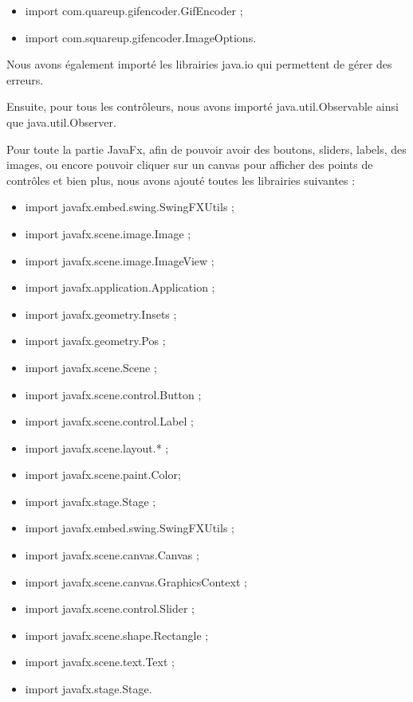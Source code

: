 \documentclass[11pt, titlepage]{article}
\begin{document}
\begin{itemize}
	\item import com.quareup.gifencoder.GifEncoder ;
	\item import com.squareup.gifencoder.ImageOptions.
\end{itemize}


Nous avons également importé les librairies java.io qui permettent de gérer des erreurs.

Ensuite, pour tous les contrôleurs, nous avons importé java.util.Observable ainsi que java.util.Observer.

Pour toute la partie JavaFx, afin de pouvoir avoir des boutons, sliders, labels, des images, ou encore pouvoir cliquer sur un canvas pour afficher des points de contrôles et bien plus, nous avons ajouté toutes les librairies suivantes :


\begin{itemize}
	\item import javafx.embed.swing.SwingFXUtils ;
	\item import javafx.scene.image.Image ;
	\item import javafx.scene.image.ImageView ;
	\item import javafx.application.Application ;
	\item import javafx.geometry.Insets ;
	\item import javafx.geometry.Pos ;
	\item import javafx.scene.Scene ;
	\item import javafx.scene.control.Button ;
	\item import javafx.scene.control.Label ;
	\item import javafx.scene.layout.* ;
	\item import javafx.scene.paint.Color;
	\item import javafx.stage.Stage ;
	\item import javafx.embed.swing.SwingFXUtils ;
	\item import javafx.scene.canvas.Canvas ;
	\item import javafx.scene.canvas.GraphicsContext ;
	\item import javafx.scene.control.Slider ;
	\item import javafx.scene.shape.Rectangle ;
	\item import javafx.scene.text.Text ;
	\item import javafx.stage.Stage.
\end{itemize}
\end{document}
